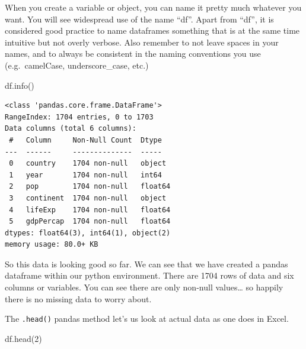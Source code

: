 \documentclass[
  letterpaper,
  DIV=11,
  numbers=noendperiod]{scrreprt}
\newenvironment{Shaded}{\begin{snugshade}}{\end{snugshade}}
\newcommand{\DecValTok}[1]{\textcolor[rgb]{0.68,0.00,0.00}{#1}}
\newcommand{\NormalTok}[1]{\textcolor[rgb]{0.00,0.23,0.31}{#1}}
\begin{document}
\begin{tcolorbox}[enhanced jigsaw, colframe=quarto-callout-tip-color-frame, toprule=.15mm, colback=white, leftrule=.75mm, rightrule=.15mm, breakable, colbacktitle=quarto-callout-tip-color!10!white, arc=.35mm, bottomtitle=1mm, bottomrule=.15mm, titlerule=0mm, title=\textcolor{quarto-callout-tip-color}{\faLightbulb}\hspace{0.5em}{Reminder: Naming variables!}, toptitle=1mm, left=2mm, opacityback=0, coltitle=black, opacitybacktitle=0.6]
When you create a variable or object, you can name it pretty much
whatever you want. You will see widespread use of the name ``df''. Apart
from ``df'', it is considered good practice to name dataframes something
that is at the same time intuitive but not overly verbose. Also remember
to not leave spaces in your names, and to always be consistent in the
naming conventions you use (e.g.~camelCase, underscore\_case, etc.)
\end{tcolorbox}

\begin{Shaded}
\begin{Highlighting}[]
\NormalTok{df.info()}
\end{Highlighting}
\end{Shaded}

\begin{verbatim}
<class 'pandas.core.frame.DataFrame'>
RangeIndex: 1704 entries, 0 to 1703
Data columns (total 6 columns):
 #   Column     Non-Null Count  Dtype  
---  ------     --------------  -----  
 0   country    1704 non-null   object 
 1   year       1704 non-null   int64  
 2   pop        1704 non-null   float64
 3   continent  1704 non-null   object 
 4   lifeExp    1704 non-null   float64
 5   gdpPercap  1704 non-null   float64
dtypes: float64(3), int64(1), object(2)
memory usage: 80.0+ KB
\end{verbatim}

So this data is looking good so far. We can see that we have created a
pandas dataframe within our python environment. There are 1704 rows of
data and six columns or variables. You can see there are only non-null
values\ldots{} so happily there is no missing data to worry about.

The \texttt{.head()} pandas method let's us look at actual data as one
does in Excel.

\begin{Shaded}
\begin{Highlighting}[]
\NormalTok{df.head(}\DecValTok{2}\NormalTok{)}
\end{Highlighting}
\end{Shaded}
\end{document}
